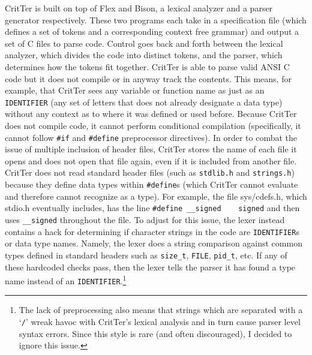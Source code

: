 \documentclass[12pt]{report}
\newcommand{\programName}{CritTer\xspace}
\begin{document}
\programName is built on top of Flex and Bison, a lexical analyzer and a  parser generator respectively. 
These two programs each take in a specification file (which defines a set of tokens and a corresponding 
context free grammar) and output a set of C files to parse code. Control goes back and forth between the 
lexical analyzer, which divides the code into distinct tokens, and the parser, which determines how the 
tokens fit together. \programName is able to parse valid ANSI C code but it does not compile or in 
anyway track the contents. This means, for example, that \programName sees any variable or function 
name as just as an \lstinline{IDENTIFIER} (any set of letters that does not already designate a data type) 
without any context as to where it was defined or used before. Because \programName does not compile 
code, it cannot perform conditional compilation (specifically, it cannot follow \lstinline{#if} and 
\lstinline{#define} preprocessor directives). In order to combat the issue of multiple inclusion of header 
files, \programName stores the name of each file it opens and does not open that file again, even if it is 
included from another file. \programName does not read standard header files (such as \lstinline{stdlib.h} 
and \lstinline{strings.h}) because they define data types within \lstinline{#define}s (which \programName 
cannot evaluate and therefore cannot recognize as a type). For example, the file sys/cdefs.h, which 
stdio.h eventually includes, has the line \lstinline{#define __signed    signed} and then uses 
\lstinline{__signed} throughout the file. To adjust for this issue, the lexer instead contains a hack for 
determining if character strings in the code are \lstinline{IDENTIFIER}s or data type names. Namely, the 
lexer does a string comparison against common types defined in standard headers such as 
\lstinline{size_t}, \lstinline{FILE}, \lstinline{pid_t}, etc. If any of these hardcoded checks pass, then the 
lexer tells the parser it has found a type name instead of an \lstinline{IDENTIFIER}.\footnote{The lack of 
preprocessing also means that strings which are separated with a `\lstinline{/}' wreak havoc with 
\programName's lexical analysis and in turn cause parser level syntax errors. Since this style is rare (and 
often discouraged), I decided to ignore this issue.}
\end{document}
